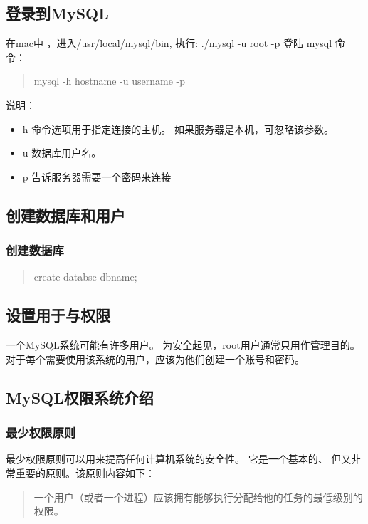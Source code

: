 \documentclass[11pt]{article}
\begin{document}
\subsection{登录到MySQL}
\label{sec:org608a3e7}
在mac中 ，进入/usr/local/mysql/bin,  执行: ./mysql -u root -p   登陆 mysql
命令：
\begin{quote}
mysql -h hostname -u username -p
\end{quote}

说明：
\begin{itemize}
\item h 命令选项用于指定连接的主机。 如果服务器是本机，可忽略该参数。
\item u 数据库用户名。
\item p 告诉服务器需要一个密码来连接
\end{itemize}
\subsection{创建数据库和用户}
\label{sec:orgccd93c7}
\subsubsection{创建数据库}
\label{sec:orgbe07438}
\begin{quote}
create databse dbname;
\end{quote}
\subsection{设置用于与权限}
\label{sec:orgd5c9fd4}
一个MySQL系统可能有许多用户。  为安全起见，root用户通常只用作管理目的。 对于每个需要使用该系统的用户，应该为他们创建一个账号和密码。
\subsection{MySQL权限系统介绍}
\label{sec:orgbb398a4}
\subsubsection{最少权限原则}
\label{sec:orgfd7d41f}
最少权限原则可以用来提高任何计算机系统的安全性。 它是一个基本的、 但又非常重要的原则。该原则内容如下：
\begin{quote}
一个用户（或者一个进程）应该拥有能够执行分配给他的任务的最低级别的权限。
\end{quote}
\end{document}

